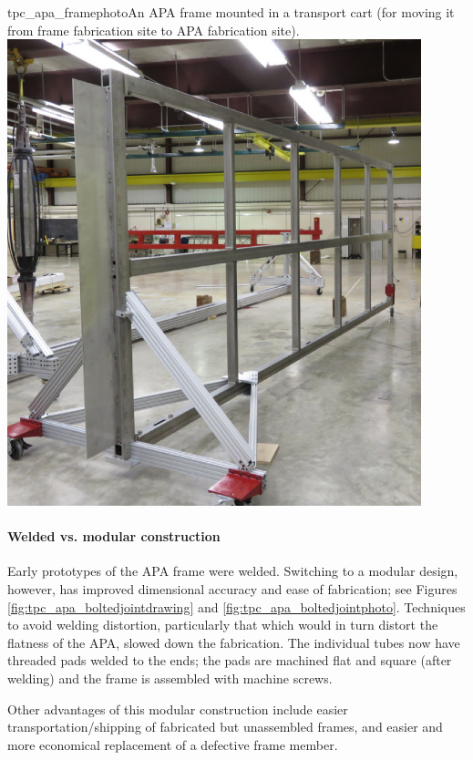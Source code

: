 \begin{cdrfigure}{tpc_apa_framephoto}{An APA frame mounted in a transport cart (for moving it from frame fabrication site to APA fabrication site).}
\includegraphics[width=0.9\textwidth]{figures/tpc_apa_framephoto.png} 
\end{cdrfigure}

\paragraph{Welded vs. modular construction}

Early prototypes of the APA frame were welded.
Switching to a modular design, however, has improved dimensional accuracy and ease of fabrication; see Figures \ref{fig:tpc_apa_boltedjointdrawing} and \ref{fig:tpc_apa_boltedjointphoto}.  
Techniques to avoid welding distortion, particularly that which would in turn distort the flatness of the APA, slowed down the fabrication.
The individual tubes now have threaded pads welded to the ends; the pads are machined flat and square (after welding) %
and the frame is assembled with machine screws.

Other advantages of this modular construction include easier transportation/shipping of fabricated but unassembled frames, and easier and more economical replacement of a defective frame member. %

